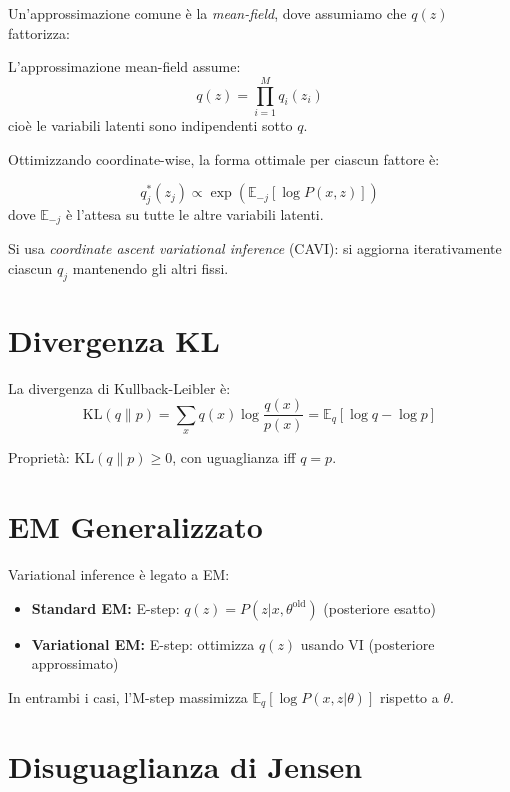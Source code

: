 Un'approssimazione comune è la \textit{mean-field}, dove assumiamo che $q(z)$ fattorizza:

\begin{definition}
  L'approssimazione mean-field assume:
  \[q(z) = \prod_{i=1}^M q_i(z_i)\]
  cioè le variabili latenti sono indipendenti sotto $q$.
\end{definition}

Ottimizzando coordinate-wise, la forma ottimale per ciascun fattore è:

\begin{theorem}
  \[q_j^*(z_j) \propto \exp\left(\mathbb{E}_{-j}[\log P(x,z)]\right)\]
  dove $\mathbb{E}_{-j}$ è l'attesa su tutte le altre variabili latenti.
\end{theorem}

Si usa \textit{coordinate ascent variational inference} (CAVI): si aggiorna iterativamente ciascun $q_j$ mantenendo gli altri fissi.

\section{Divergenza KL}

\begin{definition}
  La divergenza di Kullback-Leibler è:
  \[\text{KL}(q \| p) = \sum_x q(x) \log \frac{q(x)}{p(x)} = \mathbb{E}_q[\log q - \log p]\]

  Proprietà: $\text{KL}(q \| p) \geq 0$, con uguaglianza iff $q = p$.
\end{definition}

\section{EM Generalizzato}

Variational inference è legato a EM:

\begin{itemize}
  \item \textbf{Standard EM:} E-step: $q(z) = P(z|x,\theta^{\text{old}})$ (posteriore esatto)
  \item \textbf{Variational EM:} E-step: ottimizza $q(z)$ usando VI (posteriore approssimato)
\end{itemize}

In entrambi i casi, l'M-step massimizza $\mathbb{E}_q[\log P(x,z|\theta)]$ rispetto a $\theta$.

\section{Disuguaglianza di Jensen}

